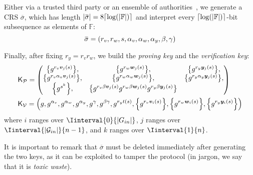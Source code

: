 Either via a trusted third party or an ensemble of authorities~\cite{GrothO2006}, we generate 
a CRS \(\overbar{\sigma}\), which has length 
\(\abs{\overbar{\sigma}} = 8\Ceil*{\call{\log}{\abs{\mathbb{F}}}}\) and interpret every 
\(\Ceil*{\call{\log}{\abs{\mathbb{F}}}}\)-bit subsequence as elements of \(\mathbb{F}\): 
\[\overbar{\sigma} = \Tuple{r_v, r_w, s, \alpha_v, \alpha_w, \alpha_y, \beta, \gamma}\]

Finally, after fixing \(r_y = r_{v}r_{w}\), we build the \emph{proving key} and the 
\emph{verification key}:
\begin{align*}
  & \ProverKey = 
  \begin{pmatrix*}
    \Set{g^{r_{v}\call{\bm{v}_j}{s}}}, &
    \Set{g^{r_{w}\call{\bm{w}_j}{s}}}, &
    \Set{g^{r_{y}\call{\bm{y}_j}{s}}}, \\
    \Set{g^{r_{v}\alpha_v\call{\bm{v}_j}{s}}}, &
    \Set{g^{r_{w}\alpha_w\call{\bm{w}_j}{s}}}, &
    \Set{g^{r_{y}\alpha_y\call{\bm{y}_j}{s}}}, \\
    \Set{g^{s^k}}, &
    \Set{g^{r_{v}{\beta}\call{\bm{v}_j}{s}}g^{r_{w}{\beta}\call{\bm{w}_j}{s}}g^{r_{y}{\beta}\call{\bm{y}_j}{s}}}
  \end{pmatrix*} \\
  & \VerifierKey = \Tuple{
    g, 
    g^{\alpha_v}, 
    g^{\alpha_w}, 
    g^{\alpha_y}, 
    g^{\gamma}, 
    g^{\beta\gamma}, 
    g^{r_{y}\call{t}{s}},
    \Set{g^{r_{v}\call{\bm{v}_i}{s}}}, 
    \Set{g^{r_{w}\call{\bm{w}_i}{s}}}, 
    \Set{g^{r_{y}\call{\bm{y}_i}{s}}}
  }
\end{align*}
where \(i\) ranges over \(\Iinterval{0}{\abs{G_{in}}}\), \(j\) ranges over 
\(\Iinterval{\abs{\mathcal{G}_{in}}}{n-1}\), and \(k\) ranges over \(\Iinterval{1}{n}\).

It is important to remark that \(\overbar{\sigma}\) must be deleted immediately after generating 
the two keys, as it can be exploited to tamper the protocol 
(in jargon, we say that it is \emph{toxic waste}).

